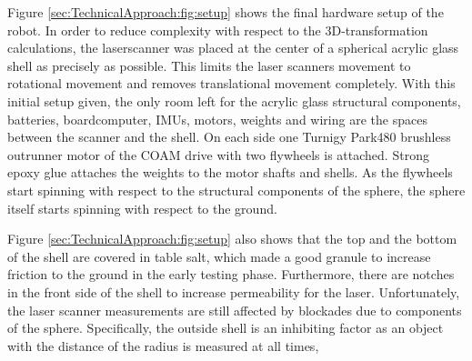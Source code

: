 Figure \ref{sec:TechnicalApproach:fig:setup} shows the final hardware setup of the robot.
In order to reduce complexity with respect to the 3D-transformation calculations, the laserscanner was placed at the center of a spherical acrylic glass shell as precisely as possible.
This limits the laser scanners movement to rotational movement and removes translational movement completely. With this initial setup given, the only room left for the acrylic glass structural components, batteries, boardcomputer, IMUs, motors, weights and wiring are the spaces between the scanner and the shell. On each side one Turnigy Park480 brushless outrunner motor \cite{turnigymotor} of the COAM drive with two flywheels is attached.
Strong epoxy glue attaches the weights to the motor shafts and shells.
As the flywheels start spinning with respect to the structural components of the sphere, the sphere itself starts spinning with respect to the ground. 

Figure \ref{sec:TechnicalApproach:fig:setup} also shows that the top and the bottom of the shell are covered in table salt, which made a good granule to increase friction to the ground in the early testing phase. Furthermore, there are notches in the front side of the shell to increase permeability for the laser.
Unfortunately, the laser scanner measurements are still affected by blockades due to components of the sphere.
Specifically, the outside shell is an inhibiting factor as an object with the distance of the radius is measured at all times, 
                                                                                                                                                                                                                  
